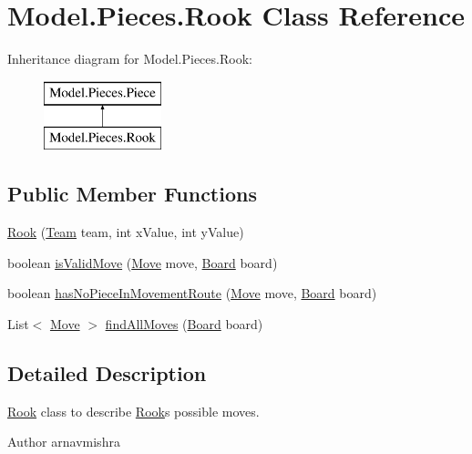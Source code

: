 \hypertarget{class_model_1_1_pieces_1_1_rook}{}\section{Model.\+Pieces.\+Rook Class Reference}
\label{class_model_1_1_pieces_1_1_rook}
Inheritance diagram for Model.\+Pieces.\+Rook\+:\begin{figure}[H]
\begin{center}
\leavevmode
\includegraphics[height=2.000000cm]{class_model_1_1_pieces_1_1_rook}
\end{center}
\end{figure}
\subsection*{Public Member Functions}
\begin{DoxyCompactItemize}
\item 
\hyperlink{class_model_1_1_pieces_1_1_rook_a3e60b56c0706a1a9bb3e02649cc91182}{Rook} (\hyperlink{class_model_1_1_team}{Team} team, int x\+Value, int y\+Value)
\item 
boolean \hyperlink{class_model_1_1_pieces_1_1_rook_a1558998b7bfff64ecd855c210978e1e9}{is\+Valid\+Move} (\hyperlink{class_model_1_1_move}{Move} move, \hyperlink{class_model_1_1_board}{Board} board)
\item 
boolean \hyperlink{class_model_1_1_pieces_1_1_rook_abcd57b340e1eb48e1eca37461373d067}{has\+No\+Piece\+In\+Movement\+Route} (\hyperlink{class_model_1_1_move}{Move} move, \hyperlink{class_model_1_1_board}{Board} board)
\item 
List$<$ \hyperlink{class_model_1_1_move}{Move} $>$ \hyperlink{class_model_1_1_pieces_1_1_rook_adf3f76fc3283bbe0b357e05fd0b3ffb8}{find\+All\+Moves} (\hyperlink{class_model_1_1_board}{Board} board)
\end{DoxyCompactItemize}


\subsection{Detailed Description}
\hyperlink{class_model_1_1_pieces_1_1_rook}{Rook} class to describe \hyperlink{class_model_1_1_pieces_1_1_rook}{Rook}\textquotesingle{}s possible moves. \begin{DoxyAuthor}{Author}
arnavmishra 
\end{DoxyAuthor}



